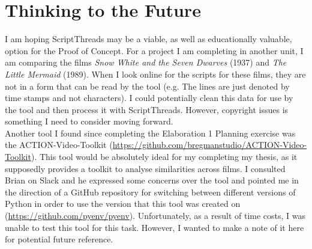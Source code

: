 \documentclass{article}
\begin{document}
\section{Thinking to the Future}
I am hoping ScriptThreads may be a viable, as well as educationally valuable, option for the Proof of Concept. For a project I am completing in another unit, I am comparing the films \textit{Snow White and the Seven Dwarves} (1937) and \textit{The Little Mermaid} (1989). When I look online for the scripts for these films, they are not in a form that can be read by the tool (e.g. The lines are just denoted by time stamps and not characters). I could potentially clean this data for use by the tool and then process it with ScriptThreads. However, copyright issues is something I need to consider moving forward.\\

Another tool I found since completing the Elaboration 1 Planning exercise was the ACTION-Video-Toolkit (\url{https://github.com/bregmanstudio/ACTION-Video-Toolkit}). This tool would be absolutely ideal for my completing my thesis, as it supposedly provides a toolkit to analyse similarities across films. I consulted Brian on Slack and he expressed some concerns over the tool and pointed me in the direction of a GitHub repository for switching between different versions of Python in order to use the version that this tool was created on (\url{https://github.com/pyenv/pyenv}). Unfortunately, as a result of time costs, I was unable to test this tool for this task. However, I wanted to make a note of it here for potential future reference.\\
\end{document}
